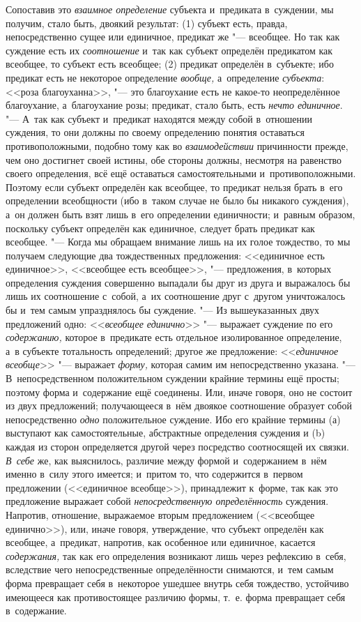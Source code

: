 Сопоставив это {\em взаимное определение} субъекта и~предиката в~суждении, мы
получим, стало быть, двоякий результат: (1) субъект есть, правда,
непосредственно сущее или единичное, предикат же "--- всеобщее. Но так как
суждение есть их {\em соотношение} и~так как субъект определён предикатом как
всеобщее, то субъект есть всеобщее; (2) предикат определён в~субъекте; ибо
предикат есть не некоторое определение {\em вообще,} а~определение
{\em субъекта}: <<роза благоуханна>>, "--- это благоухание есть не какое-то
неопределённое благоухание, а~благоухание розы; предикат, стало быть, есть
{\em нечто единичное}. "--- А~так как субъект и~предикат находятся между собой
в~отношении суждения, то они должны по своему определению понятия оставаться
противоположными, подобно тому как во {\em взаимодействии}
причинности прежде, чем оно достигнет своей истины, обе
стороны должны, несмотря на равенство своего определения, всё ещё
оставаться самостоятельными и~противоположными. Поэтому если субъект
определён как всеобщее, то предикат нельзя брать в~его определении
всеобщности (ибо в~таком случае не было бы никакого
суждения), а~он должен быть взят лишь в~его определении
единичности; и~равным образом, поскольку субъект определён как единичное,
следует брать предикат как всеобщее. "--- Когда мы обращаем
внимание лишь на их голое тождество, то мы получаем следующие два
тождественных предложения:\label{bkm:bm35a}
<<единичное есть единичное>>, <<всеобщее есть всеобщее>>, "--- предложения,
в~которых определения суждения совершенно выпадали бы друг из друга и
выражалось бы лишь их соотношение с~собой, а~их соотношение друг с~другом
уничтожалось бы и~тем самым упразднялось бы суждение. "--- Из
вышеуказанных двух предложений одно: <<{\em всеобщее единично}>> "---
выражает суждение по его {\em содержанию,} которое
в~предикате есть отдельное изолированное определение, а~в субъекте
тотальность определений; другое же предложение:
<<{\em единичное всеобще}>> "--- выражает {\em форму,}
которая самим им непосредственно указана. "---
В~непосредственном положительном суждении крайние термины
ещё просты; поэтому форма и~содержание ещё соединены. Или, иначе говоря,
оно не состоит из двух предложений; получающееся в~нём двоякое соотношение
образует собой непосредственно {\em одно} положительное
суждение. Ибо его крайние термины (а) выступают как самостоятельные,
абстрактные определения суждения и (b) каждая из сторон определяется другой
через посредство соотносящей их связки. {\em В~себе} же, как
выяснилось, различие между формой и~содержанием в~нём именно в~силу этого
имеется; и~притом то, что содержится в~первом предложении (<<единичное
всеобще>>), принадлежит к~форме, так как это предложение выражает собой
{\em непосредственную определённость} суждения. Напротив, отношение,
выражаемое вторым предложением (<<всеобщее единично>>), или, иначе говоря,
утверждение, что субъект определён как всеобщее, а~предикат, напротив, как
особенное или единичное, касается {\em содержания,} так как его определения
возникают лишь через рефлексию в~себя, вследствие чего непосредственные
определённости снимаются, и~тем самым форма превращает себя в~некоторое ушедшее
внутрь себя тождество, устойчиво имеющееся как противостоящее различию формы,
т.~е. форма превращает себя в~содержание.

